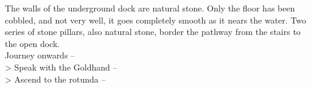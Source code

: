 The walls of the underground dock are natural stone. Only the floor has been cobbled, and not very well, it goes completely smooth as it nears the water. Two series of stone pillars, also natural stone, border the pathway from the stairs to the open dock.\\

 Journey onwards -- \\ %
> Speak with the Goldhand -- \\
> Ascend to the rotunda -- 